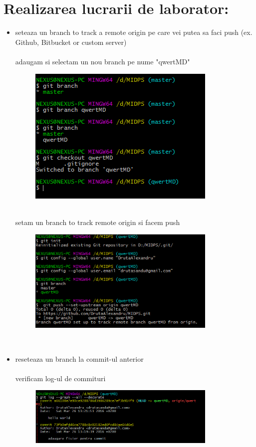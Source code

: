 \section{Realizarea lucrarii de laborator:}

\begin{itemize}
	\item seteaza un branch to track a remote origin pe care vei putea sa faci push (ex. Github, Bitbucket or custom server)
	\\
	\\
	adaugam si selectam un nou branch pe nume "qwertMD"
	\begin{figure}[ht!]
		\centering
		\includegraphics[width=90mm]{1.png}
	\end{figure}
	\\
	setam un branch to track remote origin si facem push
	\begin{figure}[ht!]
		\centering
		\includegraphics[width=90mm]{2.png}
	\end{figure}
	\\
	
	\item reseteaza un branch la commit-ul anterior
	\\
	\\
	verificam log-ul de commituri
	\begin{figure}[ht!]
		\centering
		\includegraphics[width=90mm]{3.png}
	\end{figure}
	\\
	\\
	

\end{itemize}
